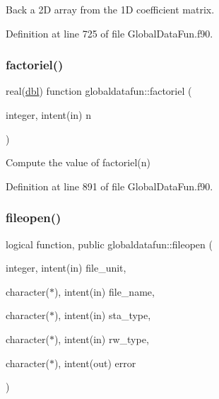 Back a 2D array from the 1D coefficient matrix. 



Definition at line 725 of file Global\+Data\+Fun.\+f90.

\mbox{\label{namespaceglobaldatafun_a0ae214f4b91d5705b4d0107913efe369}} 
\subsubsection{\texorpdfstring{factoriel()}{factoriel()}}
{\footnotesize\ttfamily real(\hyperlink{namespaceglobaldatafun_a5008801201dd34f2af8eae07756befb4}{dbl}) function globaldatafun\+::factoriel (\begin{DoxyParamCaption}\item[{integer, intent(in)}]{n }\end{DoxyParamCaption})\hspace{0.3cm}{\ttfamily [private]}}



Compute the value of factoriel(n) 



Definition at line 891 of file Global\+Data\+Fun.\+f90.

\mbox{\label{namespaceglobaldatafun_a384e8e6270f765a8e68a8c65ac8ae9d6}} 
\subsubsection{\texorpdfstring{fileopen()}{fileopen()}}
{\footnotesize\ttfamily logical function, public globaldatafun\+::fileopen (\begin{DoxyParamCaption}\item[{integer, intent(in)}]{file\+\_\+unit,  }\item[{character($\ast$), intent(in)}]{file\+\_\+name,  }\item[{character($\ast$), intent(in)}]{sta\+\_\+type,  }\item[{character($\ast$), intent(in)}]{rw\+\_\+type,  }\item[{character($\ast$), intent(out)}]{error }\end{DoxyParamCaption})}



